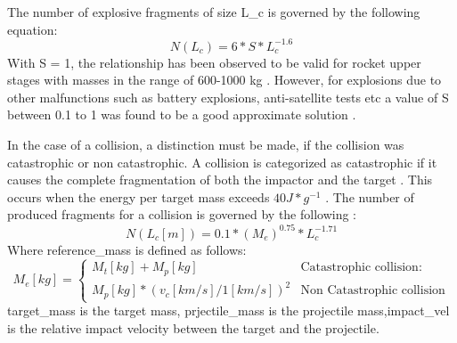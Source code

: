 \documentclass[a4paper, 12pt]{article}
\begin{document}
The number of explosive fragments of size \Gls{L_c} is governed by the following equation:
\begin{equation}
	N(L_c) =6*S * L_c^{-1.6}
\end{equation}
With S = 1, the relationship has been observed to be valid for rocket upper stages with masses in the range of 600-1000 kg \citep{johnson_nasas_2001}. However, for explosions due to other malfunctions such as battery explosions, anti-satellite tests etc a value of S between 0.1 to 1 was found to be a good approximate solution \citep{krisko_proper_2011} .

In the case of a collision, a distinction must be made, if the collision was catastrophic or non catastrophic. A collision is categorized as catastrophic if it causes the complete fragmentation of both the impactor and the target \citep{letizia_space_2016}. This occurs when the energy per target mass exceeds $40 J * g^{-1}$ \citep{krisko_proper_2011}. The number of produced fragments for a collision is governed by the following :
\begin{equation}
	N(L_c [m]) = 0.1 * (M_e)^{0.75} * L_c^{-1.71}
\end{equation}
Where \Gls{reference_mass} is defined as follows: 
\begin{equation}
	M_e[kg] = \begin{cases}
		M_t [kg] + M_p[kg]& \text{Catastrophic collision: } \\
		 M_p[kg] * (v_c [km/s] / 1 [km/s])^2 & \text{Non Catastrophic collision}	
	\end{cases}
\end{equation}
\noindent \Gls{target_mass} is the target mass, \Gls{prjectile_mass} is the projectile mass,\Gls{impact_vel} is the relative impact velocity between the target and the projectile.
\end{document}
